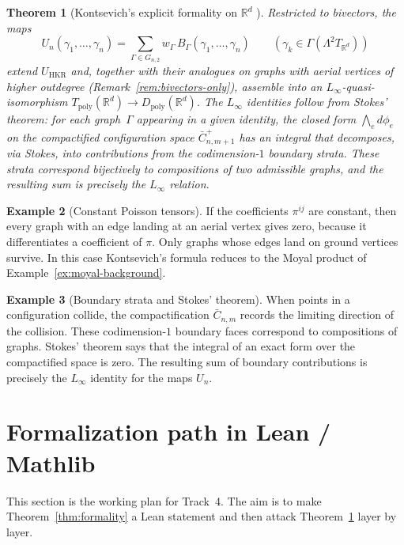 \documentclass[11pt,a4paper]{article}
\newtheorem{theorem}{Theorem}[section]
\theoremstyle{definition}
\newtheorem{example}[theorem]{Example}
\newcommand{\R}{\mathbb{R}}
\newcommand{\Tpoly}{T_{\mathrm{poly}}}
\newcommand{\Dpoly}{D_{\mathrm{poly}}}
\begin{document}
\begin{theorem}[Kontsevich's explicit formality on $\R^{d}$
{\cite[\S6.4]{Kontsevich2003}}]\label{thm:explicit}
Restricted to bivectors, the maps
\[
U_{n}(\gamma_{1}, \dots, \gamma_{n})
= \sum_{\Gamma \in G_{n,2}}
w_{\Gamma}\, B_{\Gamma}(\gamma_{1}, \dots, \gamma_{n})
\qquad (\gamma_{k} \in \Gamma(\Lambda^{2}T_{\R^{d}}))
\]
extend $U_{\mathrm{HKR}}$ and, together with their analogues on graphs
with aerial vertices of higher outdegree (Remark~\ref{rem:bivectors-only}),
assemble into an $L_\infty$-quasi-isomorphism
$\Tpoly(\R^{d}) \to \Dpoly(\R^{d})$.
The $L_\infty$ identities follow from Stokes' theorem: for each
graph~$\Gamma$ appearing in a given identity, the closed form
$\bigwedge_{e} d\phi_{e}$ on the compactified configuration space
$\bar C_{n,m+1}^{+}$ has an integral that decomposes, via Stokes, into
contributions from the codimension-$1$ boundary strata. These strata
correspond bijectively to compositions of two admissible graphs, and
the resulting sum is precisely the $L_\infty$ relation.
\end{theorem}

\begin{example}[Constant Poisson tensors]
\label{ex:constant-poisson-graphs}
If the coefficients $\pi^{ij}$ are constant, then every graph with an
edge landing at an aerial vertex gives zero, because it differentiates
a coefficient of $\pi$. Only graphs whose edges land on ground vertices
survive. In this case Kontsevich's formula reduces to the Moyal product
of Example~\ref{ex:moyal-background}.
\end{example}

\begin{example}[Boundary strata and Stokes' theorem]
\label{ex:boundary-stokes}
When points in a configuration collide, the compactification
$\bar C_{n,m}$ records the limiting direction of the collision. These
codimension-$1$ boundary faces correspond to compositions of graphs.
Stokes' theorem says that the integral of an exact form over the
compactified space is zero. The resulting sum of boundary contributions
is precisely the $L_\infty$ identity for the maps $U_n$.
\end{example}

\section{Formalization path in Lean / Mathlib}\label{sec:lean}

This section is the working plan for Track~4. The aim is to make
Theorem~\ref{thm:formality} a Lean statement and then attack
Theorem~\ref{thm:explicit} layer by layer.
\end{document}
